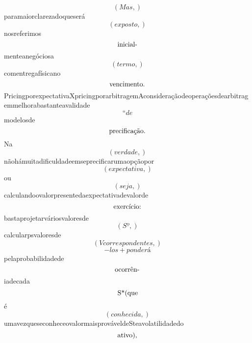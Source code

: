 \documentclass{article}
\begin{document}
\begin{equation}
\left( Mas,\right)
\end{equation}paramaiorclarezadoqueserá\begin{equation}
\left( exposto,\right)
\end{equation}nosreferimos\begin{equation}
$inicial-$
\end{equation}menteanegóciosa\begin{equation}
\left( termo,\right)
\end{equation}comentregafísicano\begin{equation}
$vencimento.$
\end{equation}PricingporexpectativaXpricingporarbitragemAconsideraçãodeoperaçõesdearbitragemmelhorabastanteavalidade\begin{equation}
“de
\end{equation}modelosde\begin{equation}
$precificação.$
\end{equation}Na\begin{equation}
\left( verdade,\right)
\end{equation}nãohámuitadificuldadeemseprecificarumaopçãopor\begin{equation}
\left( expectativa,\right)
\end{equation}ou\begin{equation}
\left( seja,\right)
\end{equation}calculandoovalorpresentedaexpectativadevalorde\begin{equation}
$exercício:$
\end{equation}bastaprojetarváriosvaloresde\begin{equation}
\left( Sº,\right)
\end{equation}calcularpsvaloresde\begin{equation}
\left( V correspondentes,\right)
\end{equation}\begin{equation}
- los + ponderá
\end{equation}pelaprobabilidadede\begin{equation}
$ocorrên-$
\end{equation}iadecada\begin{equation}
$S*(que$
\end{equation}é\begin{equation}
\left( conhecida,\right)
\end{equation}umavezqueseconheceovalormaisprováveldeSteavolatilidadedo\begin{equation}
$ativo),$

\end{equation}
\end{document}
